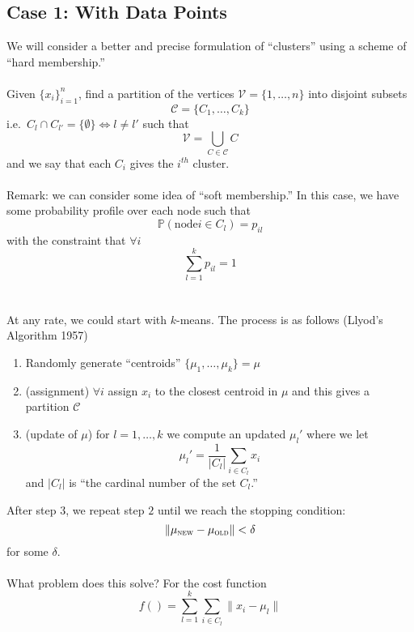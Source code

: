 \documentclass[12pt]{article}
\theoremstyle{plain}
\begin{document}
\subsection{Case 1: With Data Points}
We will consider a better and precise formulation of ``clusters'' using a scheme of ``hard membership.''
\\ \\
Given $ \{ x_i \}_{i = 1}^n $, find a partition of the vertices $ \mathcal{V} = \{ 1, \ldots, n \} $
into disjoint subsets
\[
\mathcal{C} = \{ C_1, \ldots, C_k \}
\]
i.e.\ $ C_{l} \cap C_{l'} = \{ \emptyset \} \iff l \neq l' $
such that
\[
\mathcal{V} = \bigcup_{C \in \mathcal{C}} C
\]
and we say that each $ C_{i} $ gives the $ i^{th} $ cluster.
\\ \\
Remark: we can consider some idea of ``soft membership.''
In this case, we have some probability profile over each node such that
\[
\mathbb{P} (\text{node} i \in C_l) = p_{il}
\]
with the constraint that $ \forall i $
\[
\sum_{l = 1}^k p_{il} = 1
\]
\\ \\
At any rate, we could start with $ k $-means.
The process is as follows (Llyod's Algorithm 1957)
\begin{enumerate}
    \item Randomly generate ``centroids'' $ \{ \mu_1, \ldots, \mu_k \} = \mu $
    \item (assignment) $ \forall i $ assign $ x_i $ to the closest centroid in $ \mu $ and this gives a partition $ \mathcal{C} $
    \item (update of $ \mu $) for $ l = 1, \ldots, k $ we compute an updated $ \mu_l' $ where we let
    \[
    \mu_l' = \frac{1}{| C_{l} |} \sum_{i \in C_l} x_i
    \]
    and $ | C_{l} | $ is ``the cardinal number of the set $ C_l $.''
\end{enumerate}
After step $ 3 $, we repeat step $ 2 $ until we reach the stopping condition:
\[
\| \mu_{\textsc{new}} - \mu_{\textsc{old}} \| < \delta
\]
for some $ \delta $.
\\ \\
What problem does this solve?
For the cost function
\[
f() = \sum_{l = 1}^k \sum_{i \in C_l} \| x_i - \mu_l \|
\]
\end{document}
